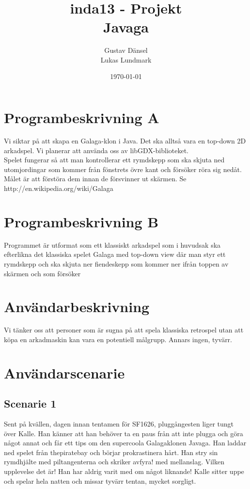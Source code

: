 \documentclass[a4paper,11pt]{article}
\title{inda13 - Projekt \\
		Javaga}
\author{Gustav Dänsel \\ Lukas Lundmark }
\date{\today}
\begin{document}
\maketitle
\section{Programbeskrivning A}
Vi siktar på att skapa en Galaga-klon i Java. Det ska alltså vara en top-down 2D arkadspel. Vi planerar att använda oss av libGDX-biblioteket. \\

Spelet fungerar så att man kontrollerar ett rymdskepp som ska skjuta ned utomjordingar som kommer från fönstrets övre kant och försöker röra sig nedåt. Målet är att förstöra dem innan de försvinner ut skärmen. Se http://en.wikipedia.org/wiki/Galaga

\section{Programbeskrivning B}
Programmet är utformat som ett klassiskt arkadspel som i huvudsak ska efterlikna det klassiska spelet Galaga med top-down view där man styr ett rymdskepp och ska skjuta ner fiendeskepp som kommer ner ifrån toppen av skärmen och som försöker 

\section{Användarbeskrivning}
Vi tänker oss att personer som är sugna på att spela klassiska retrospel utan att köpa en arkadmaskin kan vara en potentiell målgrupp. Annars ingen, tyvärr.

\section{Användarscenarie}
\subsection{Scenarie 1}
Sent på kvällen, dagen innan tentamen för SF1626, pluggångesten liger tungt över Kalle. Han känner att han behöver ta en paus från att inte plugga och göra något annat och får ett tips om den supercoola Galagaklonen Javaga. Han laddar ned spelet från thepiratebay och börjar prokrastinera hårt. Han stry sin rymdhjälte med piltangenterna och skriker avfyra! med mellanslag. Vilken upplevelse det är! Han har aldrig varit med om något liknande! Kalle sitter uppe och spelar hela natten och missar tyvärr tentan, mycket sorgligt. \\
\end{document}
